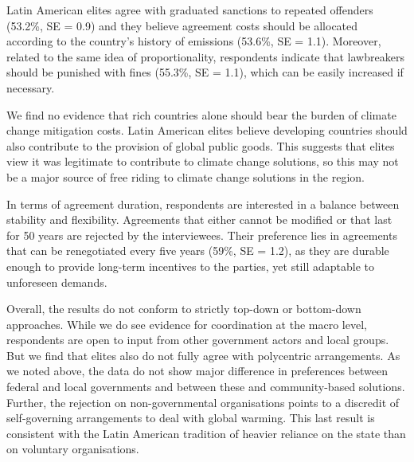 \documentclass[a4paper,12pt]{article}
\begin{document}
Latin American elites agree with graduated sanctions to repeated offenders (53.2\%, SE = 0.9) and they believe agreement costs should be allocated according to the country's history of emissions (53.6\%, SE = 1.1). Moreover, related to the same idea of proportionality, respondents indicate that lawbreakers should be punished with fines (55.3\%, SE = 1.1), which can be easily increased if necessary.

We find no evidence that rich countries alone should bear the burden of climate change mitigation costs. Latin American elites believe developing countries should also contribute to the provision of global public goods. This suggests that elites view it was legitimate to contribute to climate change solutions, so this may not be a major source of free riding to climate change solutions in the region.

In terms of agreement duration, respondents are interested in a balance between stability and flexibility. Agreements that either cannot be modified or that last for 50 years are rejected by the interviewees. Their preference lies in agreements that can be renegotiated every five years (59\%, SE = 1.2), as they are durable enough to provide long-term incentives to the parties, yet still adaptable to unforeseen demands.

Overall, the results do not conform to strictly top-down or bottom-down approaches. While we do see evidence for coordination at the macro level, respondents are open to input from other government actors and local groups. But we find that elites also do not fully agree with polycentric arrangements. As we noted above, the data do not show major difference in preferences between federal and local governments and between these and community-based solutions. Further, the rejection on non-governmental organisations points to a discredit of self-governing arrangements to deal with global warming. This last result is consistent with the Latin American tradition of heavier reliance on the state than on voluntary organisations.
\end{document}

